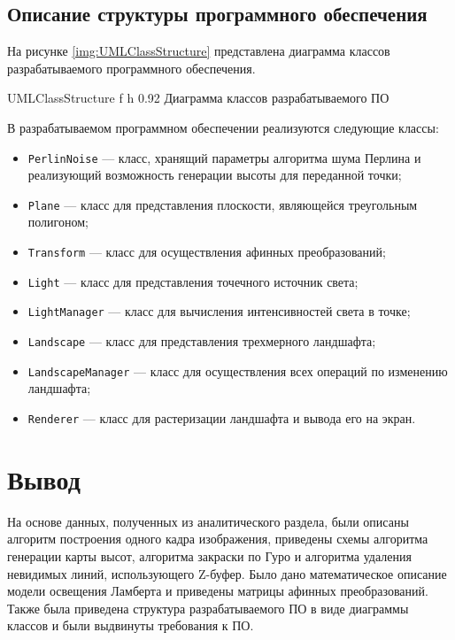 \subsection{Описание структуры программного обеспечения}

На рисунке \ref{img:UMLClassStructure} представлена диаграмма классов разрабатываемого программного обеспечения.

{UMLClassStructure} %
{f} %
{h} %
{0.92\textwidth} %
{Диаграмма классов разрабатываемого ПО} %

\clearpage

В разрабатываемом программном обеспечении реализуются следующие классы: 

\begin{itemize}[label*=--]
	\item \texttt{PerlinNoise} --- класс, хранящий параметры алгоритма шума Перлина и реализующий возможность генерации высоты для переданной точки;
	\item \texttt{Plane} --- класс для представления плоскости, являющейся треугольным полигоном;
	\item \texttt{Transform} --- класс для осуществления афинных преобразований;
	\item \texttt{Light} --- класс  для представления точечного источник света;
	\item \texttt{LightManager} --- класс для вычисления интенсивностей света в точке;
	\item \texttt{Landscape} --- класс для представления трехмерного ландшафта;
	\item \texttt{LandscapeManager} --- класс для осуществления всех операций по изменению ландшафта;
	\item \texttt{Renderer} --- класс для растеризации ландшафта и вывода его на экран.
\end{itemize}

\section*{Вывод}

На основе данных, полученных из аналитического раздела, были описаны алгоритм построения одного кадра изображения, приведены схемы алгоритма генерации карты высот, алгоритма закраски по Гуро и алгоритма удаления невидимых линий, использующего Z-буфер. 
Было дано математическое описание модели освещения Ламберта и приведены матрицы афинных преобразований. 
Также была приведена структура разрабатываемого ПО в виде диаграммы классов и были выдвинуты требования к ПО.

